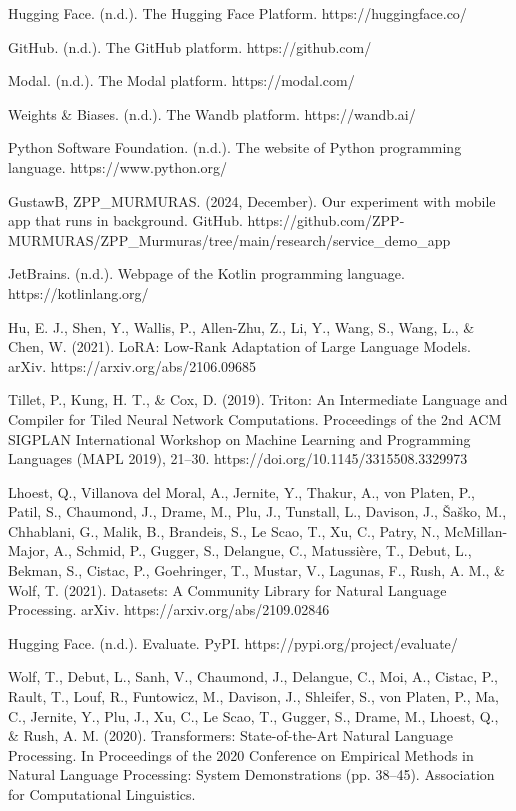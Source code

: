 \documentclass[licencjacka,en]{pracamgr}
\begin{document}
\begin{thebibliography}{99}
Hugging Face. (n.d.). The Hugging Face Platform. https://huggingface.co/

GitHub. (n.d.). The GitHub platform. https://github.com/

Modal. (n.d.). The Modal platform. https://modal.com/

Weights \& Biases. (n.d.). The Wandb platform. https://wandb.ai/

Python Software Foundation. (n.d.). The website of Python programming language. https://www.python.org/

GustawB, ZPP\_MURMURAS. (2024, December). Our experiment with mobile app that runs in background. GitHub. https://github.com/ZPP-MURMURAS/ZPP\_Murmuras/tree/main/research/service\_demo\_app

JetBrains. (n.d.). Webpage of the Kotlin programming language. https://kotlinlang.org/

Hu, E. J., Shen, Y., Wallis, P., Allen-Zhu, Z., Li, Y., Wang, S., Wang, L., \& Chen, W. (2021). LoRA: Low-Rank Adaptation of Large Language Models. arXiv. https://arxiv.org/abs/2106.09685

Tillet, P., Kung, H. T., \& Cox, D. (2019). Triton: An Intermediate Language and Compiler for Tiled Neural Network Computations. Proceedings of the 2nd ACM SIGPLAN International Workshop on Machine Learning and Programming Languages (MAPL 2019), 21–30. https://doi.org/10.1145/3315508.3329973

Lhoest, Q., Villanova del Moral, A., Jernite, Y., Thakur, A., von Platen, P., Patil, S., Chaumond, J., Drame, M., Plu, J., Tunstall, L., Davison, J., Šaško, M., Chhablani, G., Malik, B., Brandeis, S., Le Scao, T., Xu, C., Patry, N., McMillan-Major, A., Schmid, P., Gugger, S., Delangue, C., Matussière, T., Debut, L., Bekman, S., Cistac, P., Goehringer, T., Mustar, V., Lagunas, F., Rush, A. M., \& Wolf, T. (2021). Datasets: A Community Library for Natural Language Processing. arXiv. https://arxiv.org/abs/2109.02846

Hugging Face. (n.d.). Evaluate. PyPI. https://pypi.org/project/evaluate/

Wolf, T., Debut, L., Sanh, V., Chaumond, J., Delangue, C., Moi, A., Cistac, P., Rault, T., Louf, R., Funtowicz, M., Davison, J., Shleifer, S., von Platen, P., Ma, C., Jernite, Y., Plu, J., Xu, C., Le Scao, T., Gugger, S., Drame, M., Lhoest, Q., \& Rush, A. M. (2020). Transformers: State-of-the-Art Natural Language Processing. In Proceedings of the 2020 Conference on Empirical Methods in Natural Language Processing: System Demonstrations (pp. 38–45). Association for Computational Linguistics.


\end{thebibliography}
\end{document}
